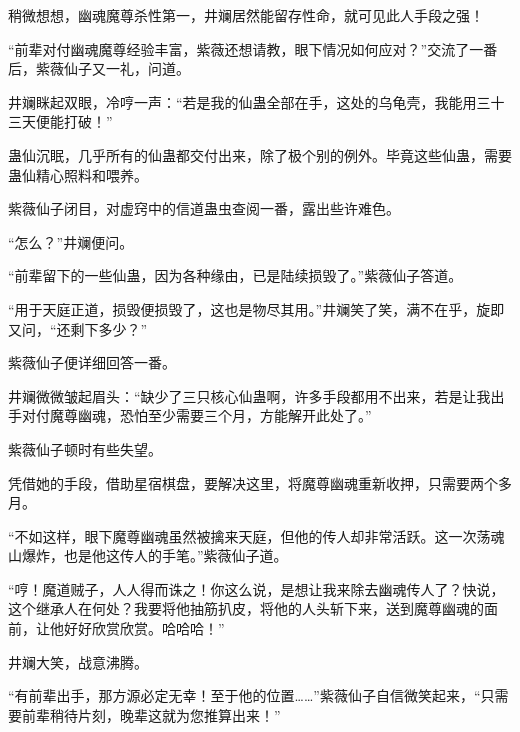 \begin{this_body}
稍微想想，幽魂魔尊杀性第一，井斓居然能留存性命，就可见此人手段之强！

“前辈对付幽魂魔尊经验丰富，紫薇还想请教，眼下情况如何应对？”交流了一番后，紫薇仙子又一礼，问道。

井斓眯起双眼，冷哼一声：“若是我的仙蛊全部在手，这处的乌龟壳，我能用三十三天便能打破！”

蛊仙沉眠，几乎所有的仙蛊都交付出来，除了极个别的例外。毕竟这些仙蛊，需要蛊仙精心照料和喂养。

紫薇仙子闭目，对虚窍中的信道蛊虫查阅一番，露出些许难色。

“怎么？”井斓便问。

“前辈留下的一些仙蛊，因为各种缘由，已是陆续损毁了。”紫薇仙子答道。

“用于天庭正道，损毁便损毁了，这也是物尽其用。”井斓笑了笑，满不在乎，旋即又问，“还剩下多少？”

紫薇仙子便详细回答一番。

井斓微微皱起眉头：“缺少了三只核心仙蛊啊，许多手段都用不出来，若是让我出手对付魔尊幽魂，恐怕至少需要三个月，方能解开此处了。”

紫薇仙子顿时有些失望。

凭借她的手段，借助星宿棋盘，要解决这里，将魔尊幽魂重新收押，只需要两个多月。

“不如这样，眼下魔尊幽魂虽然被擒来天庭，但他的传人却非常活跃。这一次荡魂山爆炸，也是他这传人的手笔。”紫薇仙子道。

“哼！魔道贼子，人人得而诛之！你这么说，是想让我来除去幽魂传人了？快说，这个继承人在何处？我要将他抽筋扒皮，将他的人头斩下来，送到魔尊幽魂的面前，让他好好欣赏欣赏。哈哈哈！”

井斓大笑，战意沸腾。

“有前辈出手，那方源必定无幸！至于他的位置……”紫薇仙子自信微笑起来，“只需要前辈稍待片刻，晚辈这就为您推算出来！”

\end{this_body}

